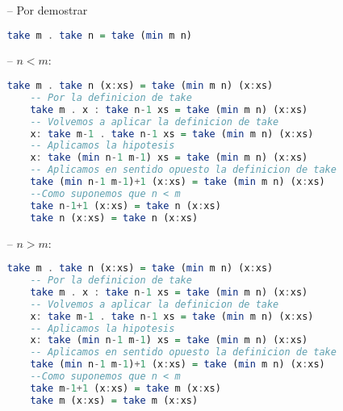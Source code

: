 \documentclass[spanish,12pt,letterpaper]{article}
\begin{document}
\begin{itemize}
\begin{itemize}
  	\begin{itemize}
  	\item[--] Por demostrar
  	\begin{lstlisting}[language=Haskell]
  	take m . take n = take (min m n)\end{lstlisting}
  	\item[--] $n < m$:
  	\begin{lstlisting}[language=Haskell]
  	take m . take n (x:xs) = take (min m n) (x:xs)
  	-- Por la definicion de take
  	take m . x : take n-1 xs = take (min m n) (x:xs)
  	-- Volvemos a aplicar la definicion de take
  	x: take m-1 . take n-1 xs = take (min m n) (x:xs)
  	-- Aplicamos la hipotesis
  	x: take (min n-1 m-1) xs = take (min m n) (x:xs)
  	-- Aplicamos en sentido opuesto la definicion de take
  	take (min n-1 m-1)+1 (x:xs) = take (min m n) (x:xs)
  	--Como suponemos que n < m
  	take n-1+1 (x:xs) = take n (x:xs)
  	take n (x:xs) = take n (x:xs)\end{lstlisting}
  	\item[--] $n > m$:
  	\begin{lstlisting}[language=Haskell]
  	take m . take n (x:xs) = take (min m n) (x:xs)
  	-- Por la definicion de take
  	take m . x : take n-1 xs = take (min m n) (x:xs)
  	-- Volvemos a aplicar la definicion de take
  	x: take m-1 . take n-1 xs = take (min m n) (x:xs)
  	-- Aplicamos la hipotesis
  	x: take (min n-1 m-1) xs = take (min m n) (x:xs)
  	-- Aplicamos en sentido opuesto la definicion de take
  	take (min n-1 m-1)+1 (x:xs) = take (min m n) (x:xs)
  	--Como suponemos que n < m
  	take m-1+1 (x:xs) = take m (x:xs)
  	take m (x:xs) = take m (x:xs)
  	\end{lstlisting}

  	\end{itemize}
  \end{itemize}


\end{itemize}
\end{document}
